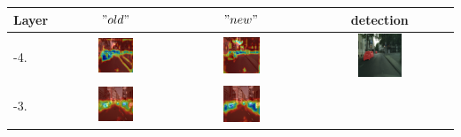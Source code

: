 \documentclass[12pt,oneside,a4paper]{article}
\theoremstyle{remark}
\newcommand{\oldh}{\( "old" \)}\label{makro2}
\newcommand{\newh}{\( "new" \)}
\begin{document}
	
	\begin{table}[h!]
		
		\noindent\begin{tabular}{|p{}|c|c|c|}
			\hline
			\noindent Layer&\oldh & \newh & detection\\
			\hline
			-4.&\includegraphics[width=0.316\textwidth]{old_layer-4} &
			\includegraphics[width=0.316\textwidth]{new_l-4} &
			\includegraphics[width=0.316\textwidth]{img} \\
			\hline
			-3.&\includegraphics[width=0.316\textwidth]{old_layer-3} &
			\includegraphics[width=0.316\textwidth]{new_layer-3} &

\end{tabular}
\end{table}
\end{document}
